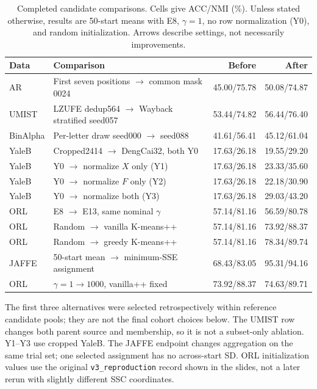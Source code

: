 {\begin{table}[!htbp]
\centering
\caption{Completed candidate comparisons. Cells give ACC/NMI (\%). Unless
stated otherwise, results are 50-start means with E8, $\gamma=1$, no row
normalization (Y0), and random initialization. Arrows describe settings,
not necessarily improvements.}
\label{tab:candidate_tests}
\small
\setlength{\tabcolsep}{3pt}
\begin{tabular}{@{}p{1.25cm}p{6.75cm}rr@{}}
\toprule
Data & Comparison & Before & After \\
\midrule
AR & First seven positions $\to$ common mask 0024
   & 45.00/75.78 & 50.08/74.87 \\
UMIST & LZUFE dedup564 $\to$ Wayback stratified seed057
   & 53.44/74.82 & 56.44/76.40 \\
BinAlpha & Per-letter draw seed000 $\to$ seed088
   & 41.61/56.41 & 45.12/61.04 \\
YaleB & Cropped2414 $\to$ DengCai32, both Y0
   & 17.63/26.18 & 19.55/29.20 \\
YaleB & Y0 $\to$ normalize $X$ only (Y1)
   & 17.63/26.18 & 23.33/35.60 \\
YaleB & Y0 $\to$ normalize $F$ only (Y2)
   & 17.63/26.18 & 22.18/30.90 \\
YaleB & Y0 $\to$ normalize both (Y3)
   & 17.63/26.18 & 29.03/43.20 \\
ORL & E8 $\to$ E13, same nominal $\gamma$
   & 57.14/81.16 & 56.59/80.78 \\
ORL & Random $\to$ vanilla K-means++
   & 57.14/81.16 & 73.92/88.37 \\
ORL & Random $\to$ greedy K-means++
   & 57.14/81.16 & 78.34/89.74 \\
JAFFE & 50-start mean $\to$ minimum-SSE assignment
   & 68.43/83.05 & 95.31/94.16 \\
ORL & $\gamma=1\to1000$, vanilla++ fixed
   & 73.92/88.37 & 74.63/89.71 \\
\bottomrule
\end{tabular}
\end{table}

The first three alternatives were selected retrospectively within reference
candidate pools; they are not the final cohort choices below. The UMIST row
changes both parent source and membership, so it is not a subset-only ablation.
Y1--Y3 use cropped YaleB. The JAFFE endpoint changes aggregation on the same
trial set; one selected assignment has no across-start SD. ORL initialization
values use the original \texttt{v3\_reproduction} record shown in the slides,
not a later rerun with slightly different SSC coordinates.

}
